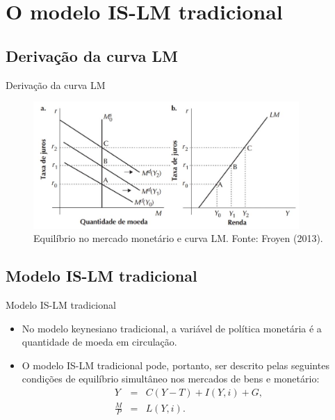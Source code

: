\documentclass[10pt]{beamer}
\begin{document}
\section{O modelo IS-LM tradicional}
\subsection{Derivação da curva LM}
\begin{frame}{Derivação da curva LM}
    \begin{figure}
        \centering
        \includegraphics[width=0.9\textwidth]{./figures/aula092_fig3.JPG}
        \caption{Equilíbrio no mercado monetário e curva LM. Fonte: Froyen (2013).}
        \label{fig3}
    \end{figure}
\end{frame}

\subsection{Modelo IS-LM tradicional}
\begin{frame}{Modelo IS-LM tradicional}
    \begin{itemize}
        \item No modelo keynesiano tradicional, a variável de política monetária é a quantidade de moeda em circulação.
        \bigskip
        \item O modelo IS-LM tradicional pode, portanto, ser descrito pelas seguintes condições de equilíbrio simultâneo nos mercados de bens e monetário:
        \begin{eqnarray}
            Y &=& C(Y-T) + I(Y,i) + G, \\
            \frac{M}{P} &=& L(Y,i).
        \end{eqnarray}
    \end{itemize}
\end{frame}
\end{document}
